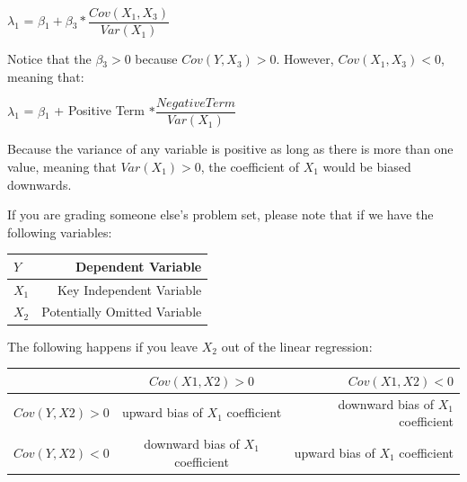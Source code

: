 \documentclass[12pt]{article}\usepackage[]{graphicx}\usepackage[]{color}
\begin{document}
\bigskip

$\lambda{_1}$ = $\beta{_1} + \beta{_3}*\dfrac{Cov(X_1,X_3)}{Var(X_1)}$

\bigskip

Notice that the $\beta{_3} > 0$ because $Cov(Y, X_3) > 0$. However, $Cov(X_1, X_3) < 0$, meaning that:

\bigskip

$\lambda{_1}$ = $\beta{_1}$ + Positive Term $* \dfrac{Negative Term}{Var(X_1)}$

\bigskip

Because the variance of any variable is positive as long as there is more than one value, meaning that $Var(X_1) > 0$, the coefficient of $X_1$ would be biased downwards. 

\bigskip

If you are grading someone else's problem set, please note that if we have the following variables:

\begin{center}
  \begin{tabular}{ | l | r | }
    \hline
    $Y$ & Dependent Variable \\ \hline
    $X_1$ & Key Independent Variable \\ \hline
    $X_2$ & Potentially Omitted Variable \\
    \hline
  \end{tabular}
\end{center}

\bigskip

The following happens if you leave $X_2$ out of the linear regression:

\bigskip

\begin{center}
    \begin{tabular}{ | l | c | r |}
    \hline
    & $Cov(X1,X2) > 0$ & $Cov(X1,X2) < 0$ \\ \hline
    $Cov(Y,X2) > 0$ & upward bias of $X_1$ coefficient & downward bias of $X_1$ coefficient \\ \hline
    $Cov(Y,X2) < 0$ & downward bias of $X_1$ coefficient & upward bias of $X_1$ coefficient \\
    \hline
    \end{tabular}
\end{center}
\end{document}
